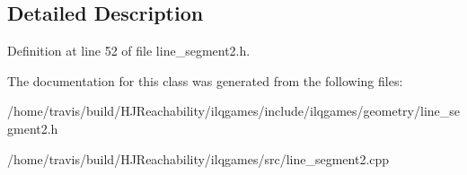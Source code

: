 \subsection{Detailed Description}


Definition at line 52 of file line\+\_\+segment2.\+h.



The documentation for this class was generated from the following files\+:\begin{DoxyCompactItemize}
\item 
/home/travis/build/\+H\+J\+Reachability/ilqgames/include/ilqgames/geometry/line\+\_\+segment2.\+h\item 
/home/travis/build/\+H\+J\+Reachability/ilqgames/src/line\+\_\+segment2.\+cpp\end{DoxyCompactItemize}

